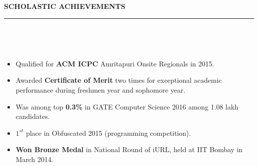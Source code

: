 \documentclass[a4paper,10pt]{article}
\newcommand{\isep}{-2 pt}
\newcommand{\lsep}{-0.5cm}
\newcommand{\resheading}[1]{{\small
        {
            \begin{minipage}
                {0.975\textwidth}\textbf{{\textsc{#1 \vphantom{p\^{E}} }}}
                \\[-0.3cm]
                \hrule
            \end{minipage}
            \\[-0.5cm]
        }
 }}
\begin{document}
\resheading{\textbf{\large SCHOLASTIC ACHIEVEMENTS}}\\[\lsep]
\begin{itemize}\itemsep \isep
    \item Qualified for \textbf{ACM ICPC} Amritapuri Onsite Regionals in 2015.
    \item Awarded \textbf{Certificate of Merit} two times for exceptional academic performance during freshmen year and sophomore year.
    \item Was among top \textbf{0.3\%} in GATE Computer Science 2016 among 1.08 lakh candidates.
    \item \textbf{$1^{st}$} place in Obfuscated 2015 (programming competition).
    \item \textbf{Won Bronze Medal} in National Round of iURL, held at IIT Bombay in March 2014.
\end{itemize}
\end{document}
